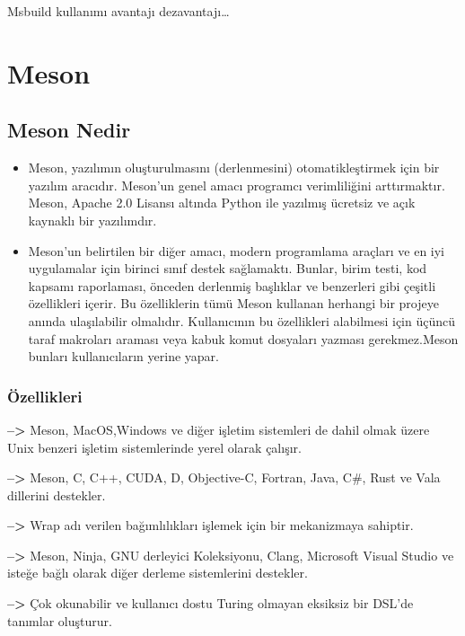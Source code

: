 \documentclass[
]{book}
\begin{document}
Msbuild kullanımı avantajı dezavantajı\ldots{}

\hypertarget{meson}{%
\chapter{Meson}\label{meson}}

\hypertarget{meson-nedir}{%
\section{Meson Nedir}\label{meson-nedir}}

\begin{itemize}
\item
  Meson, yazılımın oluşturulmasını (derlenmesini) otomatikleştirmek için bir yazılım aracıdır. Meson'un genel amacı programcı verimliliğini arttırmaktır. Meson, Apache 2.0 Lisansı altında Python ile yazılmış ücretsiz ve açık kaynaklı bir yazılımdır.
\item
  Meson'un belirtilen bir diğer amacı, modern programlama araçları ve en iyi uygulamalar için birinci sınıf destek sağlamaktı. Bunlar, birim testi, kod kapsamı raporlaması, önceden derlenmiş başlıklar ve benzerleri gibi çeşitli özellikleri içerir. Bu özelliklerin tümü Meson kullanan herhangi bir projeye anında ulaşılabilir olmalıdır. Kullanıcının bu özellikleri alabilmesi için üçüncü taraf makroları araması veya kabuk komut dosyaları yazması gerekmez.Meson bunları kullanıcıların yerine yapar.
\end{itemize}

\hypertarget{uxf6zellikleri}{%
\subsection{Özellikleri}\label{uxf6zellikleri}}

\textbf{--\textgreater{}} Meson, MacOS,Windows ve diğer işletim sistemleri de dahil olmak üzere Unix benzeri işletim sistemlerinde yerel olarak çalışır.

\textbf{--\textgreater{}} Meson, C, C++, CUDA, D, Objective-C, Fortran, Java, C\#, Rust ve Vala dillerini destekler.

\textbf{--\textgreater{}} Wrap adı verilen bağımlılıkları işlemek için bir mekanizmaya sahiptir.

\textbf{--\textgreater{}} Meson, Ninja, GNU derleyici Koleksiyonu, Clang, Microsoft Visual Studio ve isteğe bağlı olarak diğer derleme sistemlerini destekler.

\textbf{--\textgreater{}} Çok okunabilir ve kullanıcı dostu Turing olmayan eksiksiz bir DSL'de tanımlar oluşturur.
\end{document}
